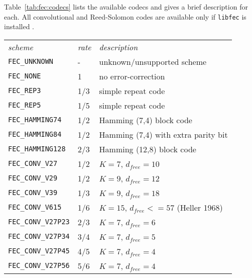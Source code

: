 Table~\ref{tab:fec:codecs} lists the available codecs and gives a brief
description for each.
All convolutional and Reed-Solomon codes are available only if {\tt libfec} is
installed \cite{fec:web}.

\begin{table*}
\caption{Forward error-correction codecs available in \liquid}
\label{tab:fec:codecs}
\centering
{\small
\begin{tabular*}{0.75\textwidth}{l@{\extracolsep{\fill}}ll}
\toprule
{\it scheme} &
{\it rate} &
{\it description}\\\otoprule
%
{\tt FEC\_UNKNOWN}              & -         & unknown/unsupported scheme\\
{\tt FEC\_NONE}                 & 1         & no error-correction\\
{\tt FEC\_REP3}                 & 1/3       & simple repeat code\\
{\tt FEC\_REP5}                 & 1/5       & simple repeat code\\
{\tt FEC\_HAMMING74}            & 1/2       & Hamming (7,4) block code\\
{\tt FEC\_HAMMING84}            & 1/2       & Hamming (7,4) with extra parity bit\\
{\tt FEC\_HAMMING128}           & 2/3       & Hamming (12,8) block code\\\midrule
%
{\tt FEC\_CONV\_V27}            & 1/2       & $K=7$, $d_{free}=10$\\
{\tt FEC\_CONV\_V29}            & 1/2       & $K=9$, $d_{free}=12$\\
{\tt FEC\_CONV\_V39}            & 1/3       & $K=9$, $d_{free}=18$\\
{\tt FEC\_CONV\_V615}           & 1/6       & $K=15$, $d_{free}<=57$ (Heller 1968)\\\midrule
%
{\tt FEC\_CONV\_V27P23}         & 2/3       & $K=7$, $d_{free}=6$\\
{\tt FEC\_CONV\_V27P34}         & 3/4       & $K=7$, $d_{free}=5$\\
{\tt FEC\_CONV\_V27P45}         & 4/5       & $K=7$, $d_{free}=4$\\
{\tt FEC\_CONV\_V27P56}         & 5/6       & $K=7$, $d_{free}=4$\\

\end{tabular*}}
\end{table*}
